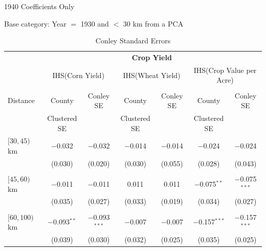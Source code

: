 \documentclass[12pt]{article}
\begin{document}
\begin{appendices}
\begin{table}
    \centering

    \caption{Conley Standard Errors}
    1940 Coefficients Only
    \label{conley_se}
\footnotesize   
\vspace{.5cm} 

Base category: Year $=$ 1930 and $<$ 30 km from a PCA
    \begin{threeparttable}[t]
    \footnotesize


\begin{tabular}{lcccccc}
\hline\hline
& \multicolumn{6}{c}{\textbf{Crop Yield}} \\
[.5em]
&\multicolumn{2}{c}{IHS(Corn Yield)}&\multicolumn{2}{c}{IHS(Wheat Yield)}&\multicolumn{2}{c}{IHS(Crop Value per Acre)}\\
[.5em]
\cline{2-7}
& & & & & & \\ 
Distance  & County           & Conley SE & County        & Conley SE &County        & Conley SE   \\
              & Clustered SE     &           &  Clustered SE &           & Clustered SE &              \\ \hline 
$[30, 45)$ km & $-$0.032       & $-$0.032        & $-$0.014   & $-$0.014    & $-$0.024        & $-$0.024           \\
              & (0.030)        & (0.020)         & (0.030)    & (0.055)     & (0.028)         & (0.043)            \\
              &                &                 &            &             &                 &                    \\
$[45, 60)$ km & $-$0.011       & $-$0.011        & 0.011      & 0.011       & $-$0.075$^{**}$ & $-$0.075$^{***}$   \\
              & (0.035)        & (0.027)         & (0.033)    & (0.019)     & (0.034)         & (0.027)            \\
              &                &                 &            &             &                 &                    \\
$[60, 100)$ km& $-$0.093$^{**}$& $-$0.093$^{***}$& $-$0.007   & $-$0.007    & $-$0.157$^{***}$& $-$0.157$^{***}$   \\
              & (0.039)        & (0.030)         & (0.032)    & (0.025)     & (0.035)         & (0.025)            \\

\end{tabular}
\end{threeparttable}
\end{table}
\end{appendices}
\end{document}
